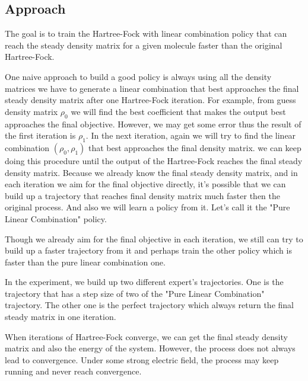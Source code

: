\documentclass[twoside]{article}
\begin{document}
\subsection{Approach}
The goal is to train the Hartree-Fock with linear combination policy that can reach the steady density matrix for a given molecule faster than the original Hartree-Fock.


One naive approach to build a good policy is always using all the density matrices we have to generate a linear combination that best approaches the final steady density matrix after one Hartree-Fock iteration.  For example, from guess density matrix $\rho_0$ we will find the best coefficient that makes the output best approaches the final objective. However, we may get some error thus the result of the first iteration is $\rho_1$.  In the next iteration, again we will try to find the linear combination $(\rho_0, \rho_1)$ that best approaches the final density matrix. we can keep doing this procedure until the output of the Hartree-Fock reaches the final steady density matrix.
Because we already know the final steady density matrix, and in each iteration we aim for the final objective directly, it's possible that we can build up a trajectory that reaches final density matrix much faster then the original process. And also we will learn a policy from it. Let's call it the "Pure Linear Combination" policy.

Though we already aim for the final objective in each iteration, we still can try to build up a faster trajectory from it and perhaps train the other policy which is faster than the pure linear combination one.

In the experiment, we build up two different expert's trajectories. 
One is the trajectory that has a step size of two of the "Pure Linear Combination" trajectory. The other one is the perfect trajectory which always return the final steady matrix in one iteration.


When iterations of Hartree-Fock converge, we can get the final steady density matrix and also the energy of the system. However, the process does not always lead to convergence. Under some strong electric field, the process may keep running and never reach convergence.
\end{document}
